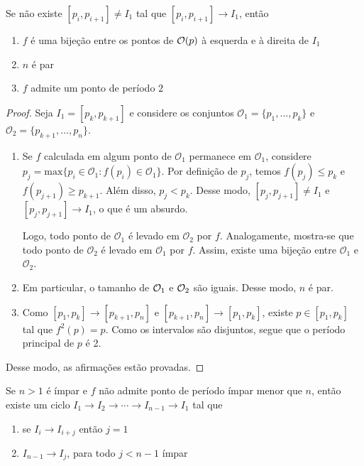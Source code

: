 \begin{lemma}
Se não existe $[p_i, p_{i+1}]  \neq I_1$  tal que $[p_i, p_{i+1}] \longrightarrow I_1$, então
\begin{enumerate}
\item $f$ é uma bijeção entre os pontos de $\mathcal{O}(p)$ à esquerda e à direita de $I_1$
\item $n$ é par
\item $f$ admite um ponto de período $2$
\end{enumerate}
\end{lemma}

\begin{proof}
Seja $I_1 = [p_k,  p_{k+1}]$ e considere os conjuntos $\mathcal{O}_1 = \{p_1, \dots, p_k\}$ e $\mathcal{O}_2 = \{p_{k+1}, \dots, p_n\}$. 
\begin{enumerate}
\item Se $f$ calculada em algum ponto de $\mathcal{O}_1$ permanece em $\mathcal{O}_1$, considere $p_j = \textrm{max}\{p_i \in \mathcal{O}_1 : f(p_i) \in \mathcal{O}_1\}$. Por definição de $p_j$, temos $f(p_j) \leq p_k$ e $f(p_{j+1}) \geq p_{k+1}$. Além disso, $p_j < p_k$. Desse modo, $[p_j, p_{j+1}] \neq I_1$ e $[p_j, p_{j+1}] \longrightarrow I_1$, o que é um absurdo.

Logo, todo ponto de $\mathcal{O}_1$ é levado em $\mathcal{O}_2$ por $f$. Analogamente, mostra-se que todo ponto de $\mathcal{O}_2$ é levado em $\mathcal{O}_1$ por $f$. Assim, existe uma bijeção entre $\mathcal{O}_1$ e $\mathcal{O}_2$.

\item Em particular, o tamanho de $\mathcal{O}_1$ e $\mathcal{O}_2$ são iguais. Desse modo, $n$ é par.

\item Como $[p_1, p_k] \longrightarrow [p_{k+1}, p_n]$ e $[p_{k+1}, p_n] \longrightarrow [p_1, p_k]$, existe $p \in [p_1, p_k]$ tal que $f^2(p) = p$. Como os intervalos são disjuntos, segue que o período principal de $p$ é 2.
\end{enumerate}
Desse modo, as afirmações estão provadas.
\end{proof}

\begin{lemma}
Se $n > 1$ é ímpar e $f$ não admite ponto de período ímpar menor que $n$, então existe um ciclo $I_1 \longrightarrow I_2 \longrightarrow \cdots \longrightarrow I_{n-1} \longrightarrow I_1$ tal que
\begin{enumerate}
\item se $I_i \longrightarrow I_{i+j}$ então $j = 1$
\item $I_{n-1} \longrightarrow I_j$, para todo $j < n-1$ ímpar
\end{enumerate} 
\end{lemma}


